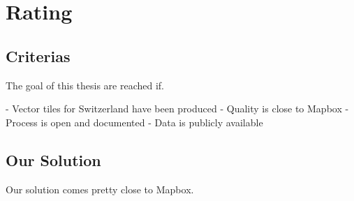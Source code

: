 \chapter{Rating}

\section{Criterias}

The goal of this thesis are reached if.

- Vector tiles for Switzerland have been produced
- Quality is close to Mapbox
- Process is open and documented
- Data is publicly available

\section{Our Solution}

Our solution comes pretty close to Mapbox.